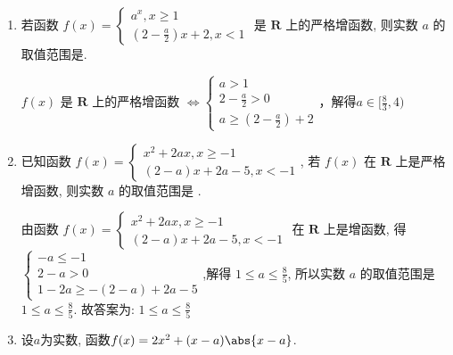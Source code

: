 \begin{enumerate}
    \begin{jieda}
    $\begin{cases}
    a\in(0,1)\\
    2a^2-5a+2>0
    \end{cases}$
    或$\begin{cases}
    a>1\\
    2a^2-5a+2<0
    \end{cases}$, 
    解得$a\in(0,\frac{1}{2})\cup(1,2)$. 
    \end{jieda}
    \item 若函数 $f(x)=\left\{\begin{array}{l}a^x, x \geq 1 \\ \left(2-\frac{a}{2}\right) x+2, x<1\end{array}\right.$ 是 $\mathbf{R}$ 上的严格增函数, 则实数 $a$ 的取值范围是\blkda{$[\frac{8}{3}, 4)$}.
    \begin{jieda}
    $f(x)$ 是 $\mathbf{R}$ 上的严格增函数 $\Longleftrightarrow \left \{ \begin{array}{l}
        a > 1  \\
        2 - \frac{a}{2} > 0 \\
        a \geq  (2-\frac{a}{2}) + 2
    \end{array}\right.$，解得$a \in [\frac{8}{3}, 4)$
    \end{jieda}
    \item 已知函数 $f(x)=\left\{\begin{array}{l}x^{2}+2 a x, x \geq-1 \\ (2-a) x+2 a-5, x<-1\end{array}\right.$, 若 $f(x)$ 在 $\mathbf{R}$ 上是严格增函数, 则实数 $a$ 的取值范围是 .
    \begin{jieda}
    由函数 $f(x)=\left\{\begin{array}{l}x^{2}+2 a x, x \geq-1 \\ (2-a) x+2 a-5, x<-1\end{array}\right.$ 在 $\mathbf{R}$ 上是增函数, 得 $\left\{\begin{array}{l}-a \leq-1 \\ 2-a>0 \\ 1-2 a \geq-(2-a)+2 a-5\end{array}\right.$,解得 $1 \leq a \leq \frac{8}{5}$,
    所以实数 $a$ 的取值范围是 $1 \leq a \leq \frac{8}{5}$.
    故答案为: $1 \leq a \leq \frac{8}{5}$
    \end{jieda}
    \item 设$a$为实数, 函数$f(x)=2x^2+(x-a)\abs{x-a}$. \\

\end{enumerate}
